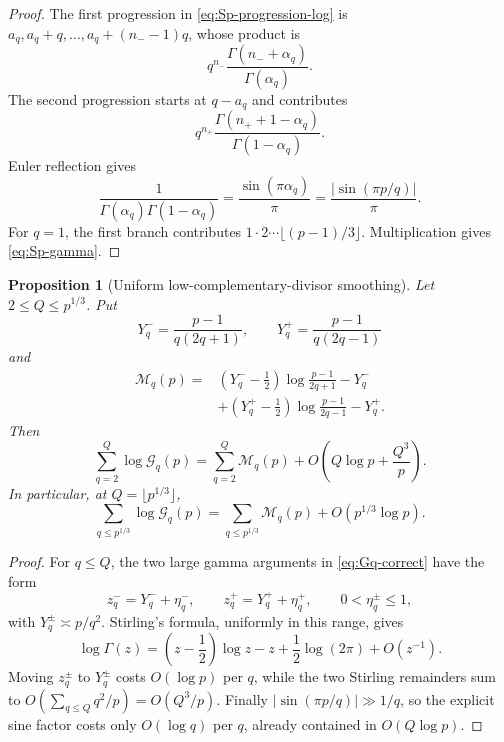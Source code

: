 \documentclass[11pt]{amsart}
\numberwithin{equation}{section}
\newtheorem{proposition}[theorem]{Proposition}
\theoremstyle{definition}
\theoremstyle{remark}
\begin{document}
\begin{proof}
The first progression in \eqref{eq:Sp-progression-log} is
\(a_q,a_q+q,\ldots,a_q+(n_--1)q\), whose product is
\[
 q^{n_-}\frac{\Gamma(n_-+\alpha_q)}{\Gamma(\alpha_q)}.
\]
The second progression starts at \(q-a_q\) and contributes
\[
 q^{n_+}\frac{\Gamma(n_++1-\alpha_q)}{\Gamma(1-\alpha_q)}.
\]
Euler reflection gives
\[
 \frac1{\Gamma(\alpha_q)\Gamma(1-\alpha_q)}
 =\frac{\sin(\pi\alpha_q)}{\pi}
 =\frac{|\sin(\pi p/q)|}{\pi}.
\]
For \(q=1\), the first branch contributes
\(1\cdot2\cdots\lfloor(p-1)/3\rfloor\).  Multiplication gives
\eqref{eq:Sp-gamma}.
\end{proof}

\begin{proposition}[Uniform low-complementary-divisor smoothing]\label{prop:low-q-stirling}
Let \(2\le Q\le p^{1/3}\).  Put
\[
 Y_q^- =\frac{p-1}{q(2q+1)},\qquad
 Y_q^+ =\frac{p-1}{q(2q-1)}
\]
and
\begin{equation}\label{eq:Mq-smooth}
\begin{aligned}
 \mathcal M_q(p)
={}&\left(Y_q^--\frac12\right)
 \log\frac{p-1}{2q+1}-Y_q^-\\
&+\left(Y_q^+-\frac12\right)
 \log\frac{p-1}{2q-1}-Y_q^+.
\end{aligned}
\end{equation}
Then
\begin{equation}\label{eq:low-q-stirling}
 \sum_{q=2}^{Q}\log\mathcal G_q(p)
 =\sum_{q=2}^{Q}\mathcal M_q(p)
 +O\!\left(Q\log p+\frac{Q^3}{p}\right).
\end{equation}
In particular, at \(Q=\lfloor p^{1/3}\rfloor\),
\begin{equation}\label{eq:low-q-third}
 \sum_{q\le p^{1/3}}\log\mathcal G_q(p)
 =\sum_{q\le p^{1/3}}\mathcal M_q(p)+O(p^{1/3}\log p).
\end{equation}
\end{proposition}

\begin{proof}
For \(q\le Q\), the two large gamma arguments in
\eqref{eq:Gq-correct} have the form
\[
 z_q^-=Y_q^-+\eta_q^-,\qquad
 z_q^+=Y_q^++\eta_q^+,
 \qquad 0<\eta_q^\pm\le1,
\]
with \(Y_q^\pm\asymp p/q^2\).  Stirling's formula, uniformly in this
range, gives
\[
 \log\Gamma(z)=\left(z-\frac12\right)\log z-z
 +\frac12\log(2\pi)+O(z^{-1}).
\]
Moving \(z_q^\pm\) to \(Y_q^\pm\) costs \(O(\log p)\) per \(q\), while
the two Stirling remainders sum to
\(O(\sum_{q\le Q}q^2/p)=O(Q^3/p)\).  Finally
\(|\sin(\pi p/q)|\gg1/q\), so the explicit sine factor costs only
\(O(\log q)\) per \(q\), already contained in \(O(Q\log p)\).
\end{proof}
\end{document}
